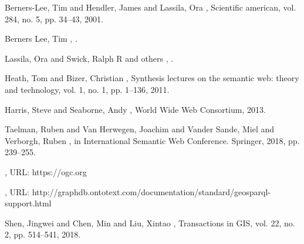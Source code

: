 \documentclass[twocolumn]{phdsymp} %
\begin{document}
%
\begin{thebibliography}{1}
    Berners-Lee, Tim and Hendler, James and Lassila, Ora
    ,
    \newblock Scientific american, vol. 284, no. 5, pp. 34–43, 2001.

    Berners Lee, Tim
    ,
    .

    Lassila, Ora and Swick, Ralph R and others
    ,
    .

    Heath, Tom and Bizer, Christian
    ,
    \newblock Synthesis lectures on the semantic web: theory and technology, vol. 1, no. 1, pp. 1–136, 2011.

    Harris, Steve and Seaborne, Andy
    ,
    \newblock World Wide Web Consortium, 2013.

    Taelman, Ruben and Van Herwegen, Joachim and Vander Sande, Miel and Verborgh, Ruben
    ,
    \newblock in International Semantic Web Conference. Springer, 2018, pp. 239–255.

    ,
    \newblock URL: https://ogc.org

    ,
    \newblock URL: http://graphdb.ontotext.com/documentation/standard/geosparql-support.html

    Shen, Jingwei and Chen, Min and Liu, Xintao
    ,
    \newblock Transactions in GIS, vol. 22, no. 2, pp. 514–541, 2018.
\end{thebibliography}
%
\end{document}
